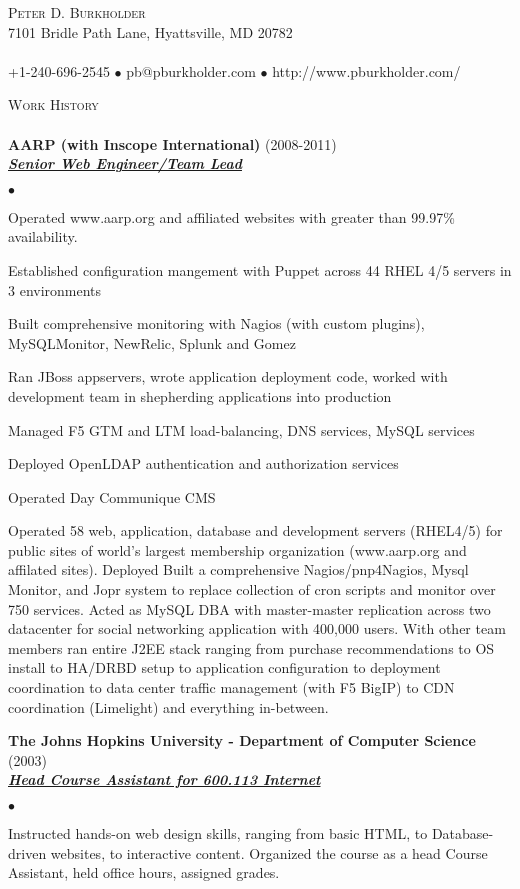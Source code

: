 \documentclass{article}
\newcommand{\lineunder}{\vspace*{-8pt} \\ \hspace*{-18pt} \hrulefill \\}
\newcommand{\header}[1]{{\hspace*{-15pt}\vspace*{6pt} \textsc{#1}} \vspace*{-6pt} \lineunder}
\newcommand{\employer}[3]{{ \textbf{#1} (#2)\\ \underline{\textbf{\emph{#3}}}\\  }}
\newcommand{\contact}[3]{
\vspace*{-8pt}
\begin{center}
{\LARGE \scshape {#1}}\\
#2 \lineunder 
#3
\end{center}
\vspace*{-8pt}
}
\newenvironment{achievements}{\begin{list}{$\bullet$}{\topsep 0pt \itemsep -2pt}}{\vspace*{4pt}\end{list}}
\begin{document}
\small
\smallskip
\vspace*{-44pt}

\contact{Peter D. Burkholder}
{7101 Bridle Path Lane, Hyattsville, MD 20782}
{+1-240-696-2545 $\bullet$ pb@pburkholder.com  $\bullet$ http://www.pburkholder.com/}

\header{Work History}
\employer{AARP (with Inscope International)}{2008-2011}{Senior Web
Engineer/Team Lead}
	\begin{achievements}
    \item Operated www.aarp.org and affiliated websites with greater than 99.97\% availability.
	\item Established configuration mangement with Puppet across 44 RHEL 4/5 servers in 3 environments
    \item Built comprehensive monitoring with Nagios (with custom plugins), MySQLMonitor, NewRelic, Splunk and Gomez
	\item Ran JBoss appservers, wrote application deployment code, worked with development team in shepherding applications into production 
	\item Managed F5 GTM and LTM load-balancing, DNS services, MySQL services
	\item Deployed OpenLDAP authentication and authorization services
	\item Operated Day Communique CMS 
    
Operated 58 web, application, database and development servers (RHEL4/5) for public sites of world's largest membership organization (www.aarp.org and affilated sites).  Deployed Built a comprehensive Nagios/pnp4Nagios, Mysql Monitor, and Jopr system to replace collection of cron scripts and monitor over 750 services.  
Acted as MySQL DBA with master-master replication across two datacenter for social networking application with 400,000 users. With other team members ran entire J2EE stack ranging from purchase recommendations to OS install to HA/DRBD setup to application configuration to deployment coordination to data center traffic management (with F5 BigIP) to CDN coordination (Limelight) and everything in-between.
	\end{achievements}

\employer{The Johns Hopkins University - Department of Computer Science}{2003}{Head Course Assistant for 600.113 Internet}
	\begin{achievements}
	\item Instructed hands-on web design skills, ranging from basic HTML, to Database-driven websites, to interactive content. Organized the course as a head Course Assistant, held office hours, assigned grades.
	\end{achievements}
\end{document}
